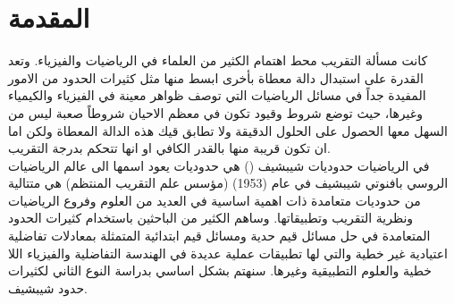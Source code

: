 \chapter*{المقدمة}

كانت مسألة التقريب محط اهتمام الكثير من العلماء في الرياضيات والفيزياء. وتعد القدرة على استبدال دالة معطاة بأخرى ابسط منها مثل كثيرات الحدود من الامور المفيدة جداً في مسائل الرياضيات التي توصف ظواهر معينة في الفيزياء والكيمياء وغيرها، حيث توضع شروط وقيود تكون في معظم الاحيان شروطاً صعبة ليس من السهل معها الحصول على الحلول الدقيقة ولا تطابق قيك هذه الدالة المعطاة ولكن اما ان تكون قريبة منها بالقدر الكافي او انها تتحكم بدرجة التقريب. \\[5pt]
في الرياضيات حدوديات شيبشيف () هي حدوديات يعود اسمها الى عالم الرياضيات الروسي بافنوتي شيبشيف في عام (1953) (مؤسس علم التقريب المنتظم) هي متتالية من حدوديات متعامدة ذات اهمية اساسية في العديد من العلوم وفروع الرياضيات ونظرية التقريب وتطبيقاتها. وساهم الكثير من الباحثين باستخدام كثيرات الحدود المتعامدة في حل مسائل قيم حدية ومسائل قيم ابتدائية المتمثلة بمعادلات تفاضلية اعتيادية غير خطية والتي لها تطبيقات عملية عديدة في الهندسة التفاضلية والفيزياء اللا خطية والعلوم التطبيقية وغيرها. سنهتم بشكل اساسي بدراسة النوع الثاني لكثيرات حدود شيبشيف.  
